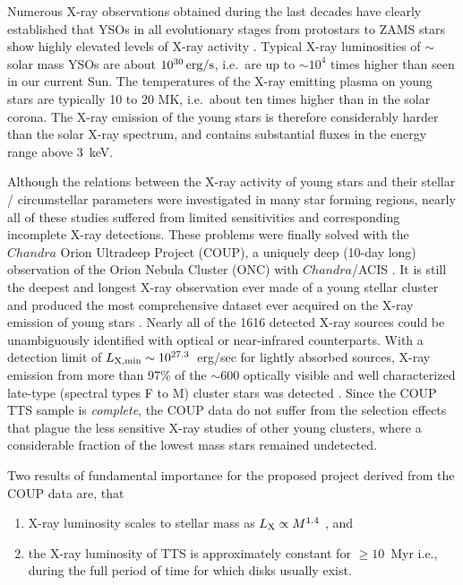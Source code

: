 \documentclass[10pt,fleqn,twoside]{article}
\begin{document}
Numerous X-ray observations obtained during the last decades have clearly
established that YSOs in all evolutionary stages from
protostars  to  ZAMS stars show highly elevated levels of X-ray  activity
\citep{FM99,PZH96,PZ02,Preibisch_coup_orig,Preibisch11,Preibisch14}.
Typical X-ray luminosities of $\sim$ solar mass YSOs are about $10^{30}\,\rm erg/s$,
i.e.~are up to $\sim 10^4$ times higher than seen in our current Sun.
The temperatures of the X-ray emitting  plasma on young stars
are typically 10 to 20 MK,  i.e.~about ten times higher than in the solar corona.
The X-ray emission of the young stars is therefore considerably harder than the solar
X-ray spectrum, and contains substantial fluxes in the
energy range above 3~keV.

Although the relations between the X-ray activity of young stars and their
stellar / circumstellar parameters were investigated in many star forming regions,
nearly all of these studies suffered from
limited sensitivities and corresponding incomplete X-ray detections.
These problems were finally solved with the
$Chandra$ Orion Ultradeep Project (COUP), a uniquely deep (10-day long)
observation of the Orion Nebula Cluster (ONC)
with $Chandra$/ACIS \citep[for details of the observation and
data analysis see][]{Getman05}.
It is still the deepest and longest X-ray
observation ever made of a young stellar cluster and
produced the most comprehensive dataset ever acquired on the X-ray
emission of young stars \citep{Preibisch_coup_orig}.
Nearly all of the 1616 detected X-ray sources could be
unambiguously identified with optical or near-infrared counterparts.
With a detection limit of
$L_{\rm X,min} \sim 10^{27.3}$~erg/sec for lightly absorbed
sources, X-ray emission from more than 97\% of the
$\sim 600$
optically visible and well characterized late-type
(spectral types F to M) cluster stars
was detected \citep{Preibisch_coup_orig}. 
Since the COUP TTS sample is {\em complete}, 
 the COUP data do not suffer from the
selection effects that plague the less sensitive X-ray studies of
other young clusters,
where a considerable fraction of the lowest mass stars remained undetected.

Two results of fundamental importance for the proposed project 
derived from the COUP data are, that
\begin{enumerate}

\item X-ray luminosity scales to stellar mass as $L_{\rm X} \propto M^{1.4}$ \citep{Preibisch_coup_orig},
and  

\item the X-ray luminosity of TTS is approximately constant for $\ge 10$~Myr \citep{PF05}
 i.e., during the full period of time for which disks usually exist.
\end{enumerate}
\end{document}
